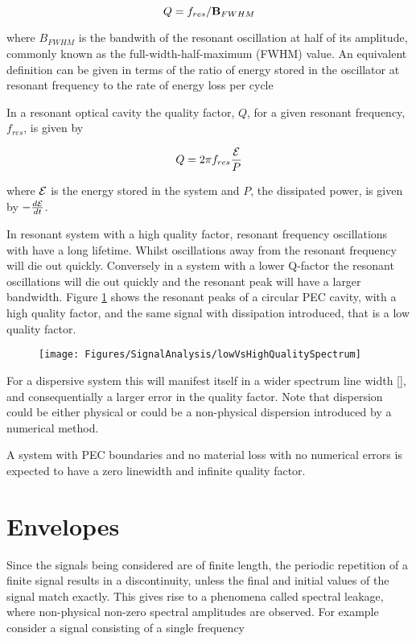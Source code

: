 $$
Q = f_{res}/\mathbf{B}_{FWHM}
$$

where $B_{FWHM}$ is the bandwith of the resonant oscillation at half of its amplitude, commonly known as the full-width-half-maximum (FWHM) value. An equivalent definition can be given in terms of the ratio of energy stored in the oscillator at resonant frequency to the rate of energy loss per cycle

In a resonant optical cavity the quality factor, $Q$, for a given resonant frequency, $f_{res}$, is given by

$$
Q = 2 \pi f_{res} \frac{\mathcal{E}}{P}
$$

where $\mathcal{E}$ is the energy stored in the system and $P$, the dissipated power, is given by $-\frac{d \mathcal{E}}{dt}$.

In resonant system with a high quality factor, resonant frequency oscillations with have a long lifetime. Whilst oscillations away from the resonant frequency will die out quickly. Conversely in a system with a lower Q-factor the resonant oscillations will die out quickly and the resonant peak will have a larger bandwidth. Figure \ref{fig:signal-analysis-low-vs-high-q-spectrum} shows the resonant peaks of a circular PEC cavity, with a high quality factor, and the same signal with dissipation introduced, that is a low quality factor.

\begin{figure}
\begin{center}
    \texttt{[image: Figures/SignalAnalysis/lowVsHighQualitySpectrum]}
\end{center}
\caption{}
\label{fig:signal-analysis-low-vs-high-q-spectrum}
\end{figure}

For a dispersive system this will manifest itself in a wider spectrum line width [], and consequentially a larger error in the quality factor. Note that dispersion could be either physical or could be a non-physical dispersion introduced by a numerical method.

A system with PEC boundaries and no material loss with no numerical errors is expected to have a zero linewidth and infinite quality factor.



\section{Envelopes}
Since the signals being considered are of finite length, the periodic repetition of a finite signal results in a discontinuity, unless the final and initial values of the signal match exactly. This gives rise to a phenomena called spectral leakage, where non-physical non-zero spectral amplitudes are observed. For example consider a signal consisting of a single frequency

